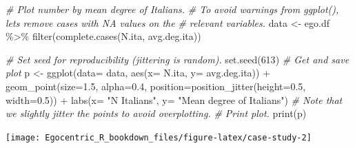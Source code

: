 \documentclass[
]{book}
\newenvironment{Shaded}{\begin{snugshade}}{\end{snugshade}}
\newcommand{\AttributeTok}[1]{\textcolor[rgb]{0.77,0.63,0.00}{#1}}
\newcommand{\CommentTok}[1]{\textcolor[rgb]{0.56,0.35,0.01}{\textit{#1}}}
\newcommand{\DecValTok}[1]{\textcolor[rgb]{0.00,0.00,0.81}{#1}}
\newcommand{\FloatTok}[1]{\textcolor[rgb]{0.00,0.00,0.81}{#1}}
\newcommand{\FunctionTok}[1]{\textcolor[rgb]{0.00,0.00,0.00}{#1}}
\newcommand{\NormalTok}[1]{#1}
\newcommand{\OtherTok}[1]{\textcolor[rgb]{0.56,0.35,0.01}{#1}}
\newcommand{\SpecialCharTok}[1]{\textcolor[rgb]{0.00,0.00,0.00}{#1}}
\newcommand{\StringTok}[1]{\textcolor[rgb]{0.31,0.60,0.02}{#1}}
\begin{document}
\begin{Shaded}
\begin{Highlighting}[]
\CommentTok{\# Plot number by mean degree of Italians.}
\CommentTok{\# To avoid warnings from ggplot(), let\textquotesingle{}s remove cases with NA values on the}
\CommentTok{\# relevant variables.}
\NormalTok{data }\OtherTok{\textless{}{-}}\NormalTok{ ego.df }\SpecialCharTok{\%\textgreater{}\%}
  \FunctionTok{filter}\NormalTok{(}\FunctionTok{complete.cases}\NormalTok{(N.ita, avg.deg.ita))}

\CommentTok{\# Set seed for reproducibility (jittering is random).}
\FunctionTok{set.seed}\NormalTok{(}\DecValTok{613}\NormalTok{)}
\CommentTok{\# Get and save plot}
\NormalTok{p }\OtherTok{\textless{}{-}} \FunctionTok{ggplot}\NormalTok{(}\AttributeTok{data=}\NormalTok{ data, }\FunctionTok{aes}\NormalTok{(}\AttributeTok{x=}\NormalTok{ N.ita, }\AttributeTok{y=}\NormalTok{ avg.deg.ita)) }\SpecialCharTok{+} 
  \FunctionTok{geom\_point}\NormalTok{(}\AttributeTok{size=}\FloatTok{1.5}\NormalTok{, }\AttributeTok{alpha=}\FloatTok{0.4}\NormalTok{, }\AttributeTok{position=}\FunctionTok{position\_jitter}\NormalTok{(}\AttributeTok{height=}\FloatTok{0.5}\NormalTok{, }\AttributeTok{width=}\FloatTok{0.5}\NormalTok{)) }\SpecialCharTok{+} 
  \FunctionTok{labs}\NormalTok{(}\AttributeTok{x=} \StringTok{"N Italians"}\NormalTok{, }\AttributeTok{y=} \StringTok{"Mean degree of Italians"}\NormalTok{)}
\CommentTok{\# Note that we slightly jitter the points to avoid overplotting.}
\CommentTok{\# Print plot.}
\FunctionTok{print}\NormalTok{(p)}
\end{Highlighting}
\end{Shaded}

\texttt{[image: Egocentric\_R\_bookdown\_files/figure-latex/case-study-2]}
\end{document}
